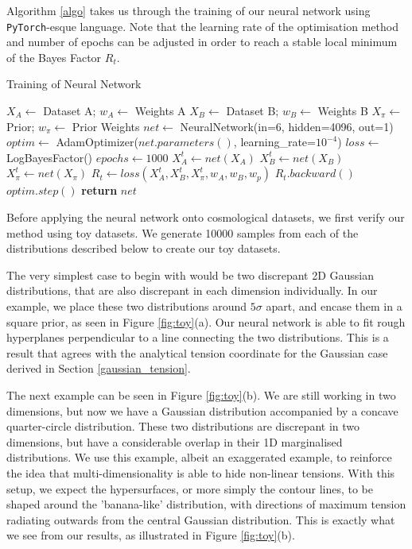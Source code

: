 \documentclass[%
 reprint,
 amsmath,amssymb,
 aps,
]{revtex4-2}
\begin{document}
Algorithm \ref{algo} takes us through the training of our neural network using \texttt{PyTorch}-esque language. Note that the learning rate of the optimisation method and number of epochs can be adjusted in order to reach a stable local minimum of the Bayes Factor $R_t$.
\begin{algorithm}[H]
\caption{Training of Neural Network}\label{algo}
    \begin{algorithmic}[1]
    \State $X_A \gets $ Dataset A; $w_A \gets $ Weights A 
    \State $X_B \gets $ Dataset B; $w_B \gets $ Weights B
    \State $X_\pi \gets $ Prior; $w_\pi \gets $ Prior Weights
    \State
    \State $net \gets $ NeuralNetwork(in=6, hidden=4096, out=1)
    \State $optim \gets $ AdamOptimizer($net.parameters()$, learning\_rate=$10^{-4}$)
    \State $loss \gets $ LogBayesFactor()
    \State $epochs \gets 1000$
    \State
        \State $X_A^t \gets net(X_A)$ 
        \State $X_B^t \gets net(X_B)$
        \State $X_\pi^t \gets net(X_\pi)$
        \State
        \State $R_t \gets loss(X_A^t, X_B^t, X_\pi^t, w_A, w_B, w_p)$
        \State $R_t.backward()$ 
        \State $optim.step()$ 
    \EndFor
    \State
    \State \textbf{return} $net$
    \end{algorithmic}
\end{algorithm}

Before applying the neural network onto cosmological datasets, we first verify our method using toy datasets. We generate 10000 samples from each of the distributions described below to create our toy datasets.

The very simplest case to begin with would be two discrepant 2D Gaussian distributions, that are also discrepant in each dimension individually. In our example, we place these two distributions around $5\sigma$ apart, and encase them in a square prior, as seen in Figure \ref{fig:toy}(a).  Our neural network is able to fit rough hyperplanes perpendicular to a line connecting the two distributions. This is a result that agrees with the analytical tension coordinate for the Gaussian case derived in Section \ref{gaussian_tension}.

The next example can be seen in Figure \ref{fig:toy}(b). We are still working in two dimensions, but now we have a Gaussian distribution accompanied by a concave quarter-circle distribution. These two distributions are discrepant in two dimensions, but have a considerable overlap in their 1D marginalised distributions. We use this example, albeit an exaggerated example, to reinforce the idea that multi-dimensionality is able to hide non-linear tensions. With this setup, we expect the hypersurfaces, or more simply the contour lines, to be shaped around the 'banana-like' distribution, with directions of maximum tension radiating outwards from the central Gaussian distribution. This is exactly what we see from our results, as illustrated in Figure \ref{fig:toy}(b).
\end{document}
